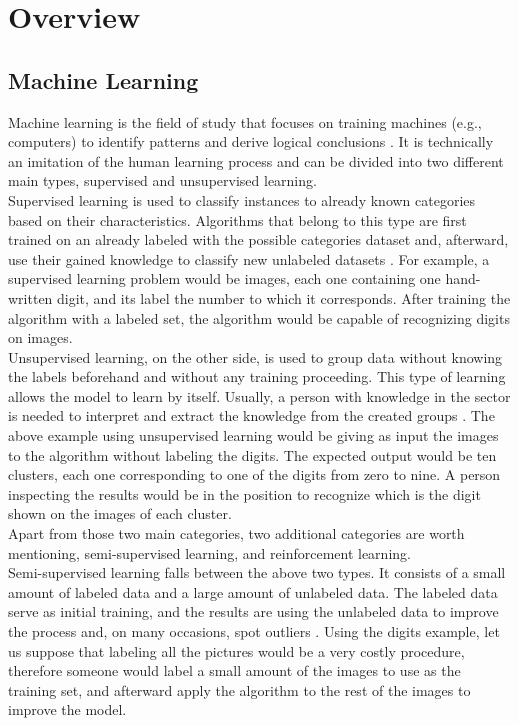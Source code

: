 \section{Overview}

\subsection{Machine Learning}
Machine learning is the field of study that focuses on training machines (e.g., computers) to identify patterns and derive logical conclusions \autocite{machDef}. It is technically an imitation of the human learning process and can be divided into two different main types, supervised and unsupervised learning. \\
Supervised learning is used to classify instances to already known categories based on their characteristics. Algorithms that belong to this type are first trained on an already labeled with the possible categories dataset and, afterward, use their gained knowledge to classify new unlabeled datasets \autocite[24]{han}. For example, a supervised learning problem would be images, each one containing one hand-written digit, and its label the number to which it corresponds. After training the algorithm with a labeled set, the algorithm would be capable of recognizing digits on images. \\
Unsupervised learning, on the other side, is used to group data without knowing the labels beforehand and without any training proceeding. This type of learning allows the model to learn by itself. Usually, a person with knowledge in the sector is needed to interpret and extract the knowledge from the created groups \autocite[25]{han}. The above example using unsupervised learning would be giving as input the images to the algorithm without labeling the digits. The expected output would be ten clusters, each one corresponding to one of the digits from zero to nine. A person inspecting the results would be in the position to recognize which is the digit shown on the images of each cluster. \\
Apart from those two main categories, two additional categories are worth mentioning, semi-supervised learning, and reinforcement learning. \\
Semi-supervised learning falls between the above two types. It consists of a small amount of labeled data and a large amount of unlabeled data. The labeled data serve as initial training, and the results are using the unlabeled data to improve the process and, on many occasions, spot outliers \autocite[25]{han}. Using the digits example, let us suppose that labeling all the pictures would be a very costly procedure, therefore someone would label a small amount of the images to use as the training set, and afterward apply the algorithm to the rest of the images to improve the model.
